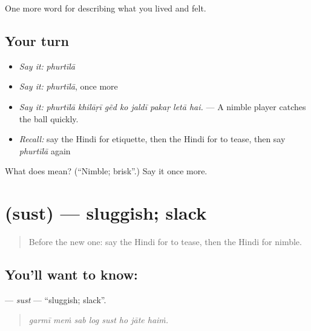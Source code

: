\begin{grammarlens}[title={What you've built}]
One more word for describing what you lived and felt.
\end{grammarlens}

\subsection*{Your turn}
\begin{itemize}
\raggedright
  \item \emph{Say it:} \emph{phurtīlā}
  \item \emph{Say it:} \emph{phurtīlā}, once more
  \item \emph{Say it:} \emph{phurtīlā khilāṛī gẽd ko jaldī pakaṛ letā hai.} — A nimble player catches the ball quickly.
  \item \emph{Recall:} say the Hindi for etiquette, then the Hindi for to tease, then say \emph{phurtīlā} again
\end{itemize}

\begin{tcolorbox}[breakable,colback=teal!4,colframe=teal!35!black,title={Before you move on}]
What does  mean? (\textquotedblleft{}Nimble; brisk\textquotedblright{}.) Say it once more.
\end{tcolorbox}
\section[\texorpdfstring{\hi{सुस्त} (sust)}{सुस्त (sust)}]{ (sust) — sluggish; slack}

\label{lesson:HI-C472-sust}



\begin{quote}
Before the new one: say the Hindi for to tease, then the Hindi for nimble.
\end{quote}

\subsection*{You'll want to know: }
\textbf{} — \emph{sust} — \textquotedblleft{}sluggish; slack\textquotedblright{}.

\begin{quote}
       
\end{quote}

\begin{quote}
\emph{garmī meṁ sab log sust ho jāte haiṁ.}
\end{quote}

